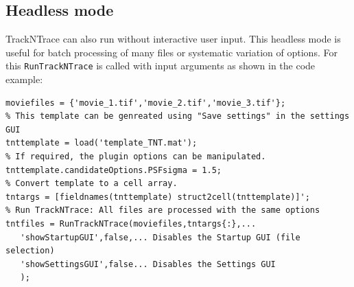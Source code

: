 \documentclass[11pt,onside]{report}
\numberwithin{equation}{chapter}
\begin{document}
\subsection{Headless mode}\label{sec:headless_mode}
TrackNTrace can also run without interactive user input. This headless mode is useful for batch processing of many files or systematic variation of options. For this \texttt{RunTrackNTrace} is called with input arguments as shown in the code example:
\begin{lstlisting}[style=Matlab-editor]
moviefiles = {'movie_1.tif','movie_2.tif','movie_3.tif'};
% This template can be genreated using "Save settings" in the settings GUI
tnttemplate = load('template_TNT.mat');
% If required, the plugin options can be manipulated.
tnttemplate.candidateOptions.PSFsigma = 1.5;
% Convert template to a cell array.
tntargs = [fieldnames(tnttemplate) struct2cell(tnttemplate)]';
% Run TrackNTrace: All files are processed with the same options
tntfiles = RunTrackNTrace(moviefiles,tntargs{:},...
   'showStartupGUI',false,... Disables the Startup GUI (file selection)
   'showSettingsGUI',false... Disables the Settings GUI
   );
\end{lstlisting}
\clearpage
\end{document}
